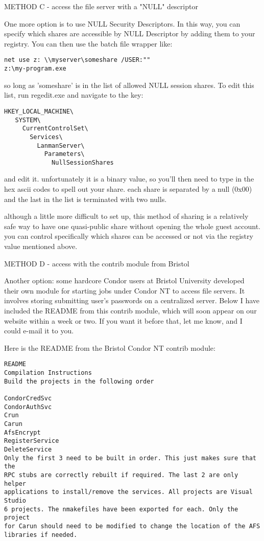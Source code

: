 \begin{description}
METHOD C - access the file server with a "NULL" descriptor

One more option is to use NULL Security Descriptors.  In this way, you
can specify which shares are accessible by NULL Descriptor by adding
them to your registry.  You can then use the batch file wrapper like:

\begin{verbatim}
net use z: \\myserver\someshare /USER:""
z:\my-program.exe
\end{verbatim}

so long as 'someshare' is in the list of allowed NULL session shares.  To
edit this list, run regedit.exe and navigate to the key:

\begin{verbatim}
HKEY_LOCAL_MACHINE\
   SYSTEM\
     CurrentControlSet\
       Services\
         LanmanServer\
           Parameters\
             NullSessionShares
\end{verbatim}

and edit it.  unfortunately it is a binary value, so you'll then need to
type in the hex ascii codes to spell out your share.  each share is
separated by a null (0x00) and the last in the list is terminated with
two nulls.

although a little more difficult to set up, this method of sharing is a
relatively safe way to have one quasi-public share without opening the
whole guest account.  you can control specifically which shares can be 
accessed or not via the registry value mentioned above.


METHOD D -  access with the contrib module from Bristol

Another option: some hardcore Condor users at Bristol University developed 
their own module for starting jobs under Condor NT to access file 
servers.  It involves storing submitting user's passwords on a centralized 
server.  Below I have included the README from this contrib module, which 
will soon appear on our website within a week or two.  If you want it 
before that, let me know, and I could e-mail it to you.

Here is the README from the Bristol Condor NT contrib module:

\begin{verbatim}
README
Compilation Instructions
Build the projects in the following order

CondorCredSvc
CondorAuthSvc
Crun
Carun
AfsEncrypt
RegisterService
DeleteService
Only the first 3 need to be built in order. This just makes sure that the 
RPC stubs are correctly rebuilt if required. The last 2 are only helper 
applications to install/remove the services. All projects are Visual Studio 
6 projects. The nmakefiles have been exported for each. Only the project 
for Carun should need to be modified to change the location of the AFS 
libraries if needed.


\end{verbatim}
\end{description}
